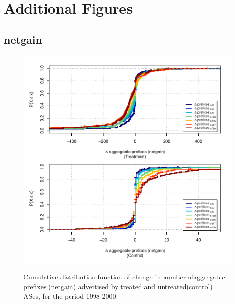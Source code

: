 \chapter{Additional Figures}
\label{chap:additional_figs}

\clearpage
\section{netgain}

\begin{figure}[H]
\begin{centering}
\begin{singlespace}
\captionsetup{list=no}
    \includegraphics[width=6in]{figures/behavior-netgain-1998_2000-corr.pdf}
    \vspace{-2em}\\
    \caption{Cumulative distribution function of change in number ofaggregable
    prefixes (netgain) advertised by treated and untreated(control) ASes, for
    the period 1998-2000.}
\end{singlespace}
\end{centering}
\end{figure}

